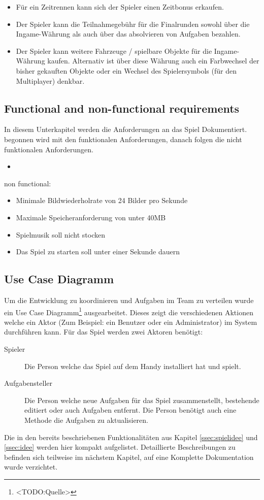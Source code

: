 \begin{enumerate}
\begin{itemize}
			\item{Für ein Zeitrennen kann sich der Spieler einen Zeitbonus erkaufen.}
			\item{Der Spieler kann die Teilnahmegebühr für die Finalrunden sowohl über die Ingame-Währung als auch über das absolvieren von Aufgaben bezahlen.}
			\item{Der Spieler kann weitere Fahrzeuge / spielbare Objekte für die Ingame-Währung kaufen. Alternativ ist über diese Währung auch ein Farbwechsel der bisher gekauften Objekte oder ein Wechsel des Spielersymbols (für den Multiplayer) denkbar.}
		\end{itemize}
	\end{enumerate}

\subsection{Functional and non-functional requirements}
	In diesem Unterkapitel werden die Anforderungen an das Spiel Dokumentiert. begonnen wird mit den funktionalen Anforderungen, danach folgen die nicht funktionalen Anforderungen.
	\begin{itemize}
		\item{  }
	\end{itemize}
	non functional:
	\begin{itemize}
		\item{ Minimale Bildwiederholrate von 24 Bilder pro Sekunde }
		\item{ Maximale Speicheranforderung von unter 40MB }
		\item{ Spielmusik soll nicht stocken }
		\item{ Das Spiel zu starten soll unter einer Sekunde dauern }
	\end{itemize}
\subsection{Use Case Diagramm}
	Um die Entwicklung zu koordinieren und Aufgaben im Team zu verteilen wurde ein Use Case Diagramm\footnote{<TODO:Quelle>} ausgearbeitet. Dieses zeigt die verschiedenen Aktionen welche ein Aktor (Zum Beispiel: ein Benutzer oder ein Administrator) im System durchführen kann. Für das Spiel werden zwei Aktoren benötigt:
	\begin{description}
		\item[Spieler]{ Die Person welche das Spiel auf dem Handy installiert hat und spielt. }
		\item[Aufgabensteller]{ Die Person welche neue Aufgaben für das Spiel zusammenstellt, bestehende editiert oder auch Aufgaben entfernt. Die Person benötigt auch eine Methode die Aufgaben zu aktualisieren. }
	\end{description}
	Die in den bereits beschriebenen Funktionalitäten aus Kapitel \ref{ssec:spielidee} und \ref{ssec:idee} werden hier kompakt aufgelistet. Detaillierte Beschreibungen zu befinden sich teilweise im nächstem Kapitel, auf eine Komplette Dokumentation wurde verzichtet.

